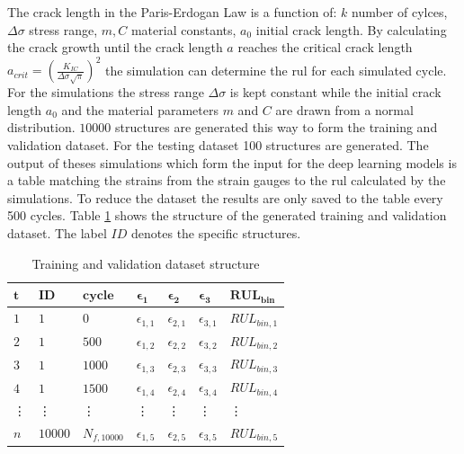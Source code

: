 \documentclass[conference]{IEEEtran}
\begin{document}
The crack length in the Paris-Erdogan Law is a function of: $k$ number of cylces, $\Delta \sigma$ stress range, $m, C$ material constants, $a_0$ initial crack length. By calculating the crack growth until the crack length $a$ reaches the critical crack length $a_{crit}=(\frac{K_{IC}}{\Delta \sigma \sqrt{\pi}})^2$ the simulation can determine the \gls{rul} for each simulated cycle. For the simulations the stress range $\Delta \sigma$ is kept constant while the initial crack length $a_0$ and the material parameters $m$ and $C$ are drawn from a normal distribution. $ 10000 $ structures are generated this way to form the training and validation dataset. For the testing dataset 100 structures are generated. The output of theses simulations which form the input for the deep learning models is a table matching the strains from the strain gauges to the \gls{rul} calculated by the simulations. To reduce the dataset the results are only saved to the table every 500 cycles. Table \ref{tab:sliding_window_approach} shows the structure of the generated training and validation dataset. The label $ ID $ denotes the specific structures.

\begin{table}[htp]
	\centering
	\caption{Training and validation dataset structure}
	\label{tab:sliding_window_approach}
	\begin{tabular}{lllllll}
		$ \boldsymbol{t} $ & $ \boldsymbol{ID} $ & $ \boldsymbol{cycle} $ & $ \boldsymbol{\epsilon_1} $     & $ \boldsymbol{\epsilon_2} $     & $ \boldsymbol{\epsilon_3} $     & $ \boldsymbol{RUL_{bin}} $   \\
		\hline
		$ 1 $ & $ 1 $  & $ 0 $     & $ \epsilon_{1,1} $ & $ \epsilon_{2,1} $ &  $ \epsilon_{3,1} $ &  $ RUL_{bin,1} $ \\
		$ 2 $ & $ 1 $  & $ 500 $   & $ \epsilon_{1,2} $ & $ \epsilon_{2,2} $ & $ \epsilon_{3,2} $ & $ RUL_{bin,2} $ \\
		$ 3 $ & $ 1 $  & $ 1000 $  & $ \epsilon_{1,3} $ & $ \epsilon_{2,3} $ & $ \epsilon_{3,3} $ & $ RUL_{bin,3} $ \\
		$ 4 $ & $ 1 $  & $ 1500 $  & $ \epsilon_{1,4} $ & $ \epsilon_{2,4} $ & $ \epsilon_{3,4} $ & $ RUL_{bin,4} $ \\
		\vdots & \vdots & \vdots & \vdots & \vdots &\vdots & \vdots \\
		$ n $ & $ 10000 $  & $ N_{f,10000} $  & $ \epsilon_{1,5} $ & $ \epsilon_{2,5} $ & $ \epsilon_{3,5} $ & $ RUL_{bin,5} $
	\end{tabular}
\end{table}
\end{document}
